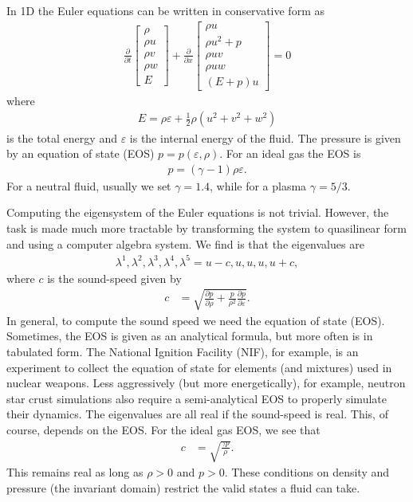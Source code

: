 \documentclass[12pt]{article}
\theoremstyle{definition}
\theoremstyle{definition}
\theoremstyle{definition}
\begin{document}
In 1D the Euler equations can be written in conservative form as
\begin{align}
  \frac{\partial}{\partial{t}}
  \left[
    \begin{matrix}
      \rho \\
      \rho u \\
      \rho v \\
      \rho w \\
      E
    \end{matrix}
  \right]
  +
  \frac{\partial}{\partial{x}}
  \left[
    \begin{matrix}
      \rho u \\
      \rho u^2 + p \\
      \rho uv \\
      \rho uw \\
      (E+p)u
    \end{matrix}
  \right]
  =
  0
\end{align}
where
\begin{align}
  E = \rho \varepsilon + \frac{1}{2}\rho (u^2 + v^2 + w^2)
\end{align}
is the total energy and $\varepsilon$ is the internal energy of the
fluid. The pressure is given by an equation of state (EOS)
$p=p(\varepsilon, \rho)$. For an ideal gas the EOS is
\begin{align}
  p =(\gamma-1)\rho \varepsilon.
\end{align}
For a neutral fluid, usually we set $\gamma = 1.4$, while for a plasma
$\gamma = 5/3$.

Computing the eigensystem of the Euler equations is not
trivial. However, the task is made much more tractable by transforming
the system to quasilinear form and using a computer algebra system. We
find is that the eigenvalues are
\begin{align}
  \lambda^1, \lambda^2, \lambda^3, \lambda^4, \lambda^5
  =
  u-c, u, u, u, u+c,
\end{align}
where $c$ is the sound-speed given by
\begin{align}
  c &= \sqrt{\frac{\partial p}{\partial \rho} 
    + \frac{p}{\rho^2}\frac{\partial p}{\partial \varepsilon}}.  
\end{align}
In general, to compute the sound speed we need the equation of state
(EOS). Sometimes, the EOS is given as an analytical formula, but more
often is in tabulated form. The National Ignition Facility (NIF), for
example, is an experiment to collect the equation of state for
elements (and mixtures) used in nuclear weapons. Less aggressively
(but more energetically), for example, neutron star crust simulations
also require a semi-analytical EOS to properly simulate their
dynamics. The eigenvalues are all real if the sound-speed is
real. This, of course, depends on the EOS. For the ideal gas EOS, we
see that
\begin{align}
  c &= \sqrt{\frac{\gamma p}{\rho}}.
\end{align}
This remains real as long as $\rho > 0$ and $p > 0$. These conditions
on density and pressure (the invariant domain) restrict the valid
states a fluid can take.
\end{document}
